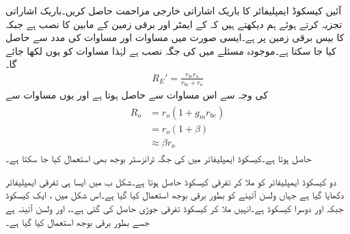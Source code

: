 آئیں کیسکوڈ ایمپلیفائر کا باریک اشاراتی خارجی مزاحمت  حاصل کریں۔باریک اشاراتی تجزیہ کرتے ہوئے ہم دیکھتے ہیں کہ  کے ایمٹر اور برقی زمین کے مابین  کا  نصب ہے جبکہ  کا بیس برقی زمین پر ہے۔ایسی صورت میں مساوات  اور مساوات  کی مدد سے  حاصل کیا جا سکتا ہے۔موجودہ مسئلے میں  کی جگہ  نصب ہے لہٰذا مساوات  کو یوں لکھا جائے گا۔
\begin{align*}
R_E'=\frac{r_{be} r_o}{r_{be}+r_o}
\end{align*}
 کی وجہ سے  اس مساوات سے  حاصل ہوتا ہے اور یوں مساوات  سے
\begin{gather}
\begin{aligned}\label{مساوات_تفرقی_کیسکوڈ_کی_خارجی_مزاحمت}
R_o&=r_o \left(1+g_m r_{be} \right)\\
&=r_o \left(1+\beta \right)\\
&\approx  \beta r_o
\end{aligned}
\end{gather}
حاصل ہوتا ہے۔کیسکوڈ ایمپلیفائر میں  کی جگہ ٹرانزسٹر بوجھ بھی استعمال کیا جا سکتا ہے۔

دو کیسکوڈ ایمپلیفائر کو ملا کر تفرقی کیسکوڈ حاصل ہوتا ہے۔شکل  ب میں ایسا ہی تفرقی ایمپلیفائر دکھایا گیا ہے جہاں ولسن آئینے کو بطور برقی بوجھ استعمال کیا گیا ہے۔اس شکل میں ،  ایک کیسکوڈ جبکہ   اور  دوسرا کیسکوڈ ہے۔انہیں ملا کر  کیسکوڈ تفرقی جوڑی حاصل کی گئی ہے۔،  اور  ولسن آئینہ ہے جسے بطور برقی بوجھ استعمال کیا گیا ہے۔

